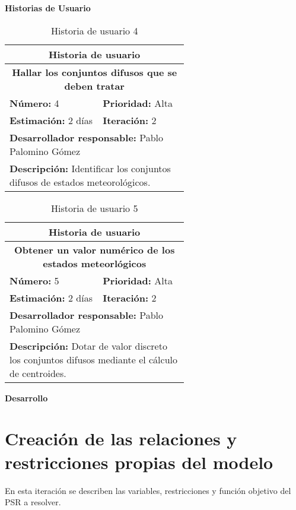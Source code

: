 \textbf{Historias de Usuario}\\

\begin{table}[H]
        \centering
        \begin{tabular}{|p{0.3\linewidth}|p{0.3\linewidth}|}
          \hline
          \multicolumn{2}{|c|}{Historia de usuario}\\ \hline
          \multicolumn{2}{|c|}{\textbf{Hallar los conjuntos difusos que se deben tratar}}\\ \hline
          \textbf{Número:} 4 & \textbf{Prioridad:} Alta\\ \hline
          \textbf{Estimación:} 2 días & \textbf{Iteración:} 2\\ \hline
          \multicolumn{2}{|l|}{\textbf{Desarrollador responsable:} Pablo Palomino Gómez}\\ \hline
          \multicolumn{2}{|p{0.6\linewidth}|}{\textbf{Descripción:} Identificar los conjuntos difusos de estados meteorológicos.}\\ \hline
        \end{tabular}
        \caption{Historia de usuario 4}
        \label{tab:hist4}
\end{table}
\begin{table}[H]
        \centering
        \begin{tabular}{|p{0.3\linewidth}|p{0.3\linewidth}|}
          \hline
          \multicolumn{2}{|c|}{Historia de usuario}\\ \hline
          \multicolumn{2}{|c|}{\textbf{Obtener un valor numérico de los estados meteorlógicos}}\\ \hline
          \textbf{Número:} 5 & \textbf{Prioridad:} Alta\\ \hline
          \textbf{Estimación:} 2 días & \textbf{Iteración:} 2\\ \hline
          \multicolumn{2}{|l|}{\textbf{Desarrollador responsable:} Pablo Palomino Gómez}\\ \hline
          \multicolumn{2}{|p{0.6\linewidth}|}{\textbf{Descripción:} Dotar de valor discreto los conjuntos difusos mediante el cálculo de centroides.}\\ \hline
        \end{tabular}
        \caption{Historia de usuario 5}
        \label{tab:hist5}
\end{table}
\textbf{Desarrollo}\\


\section{Creación de las relaciones y restricciones propias del modelo}
\label{sec:hito3}
En esta iteración se describen las variables, restricciones y función objetivo del \gls{PSR} a resolver.\\

